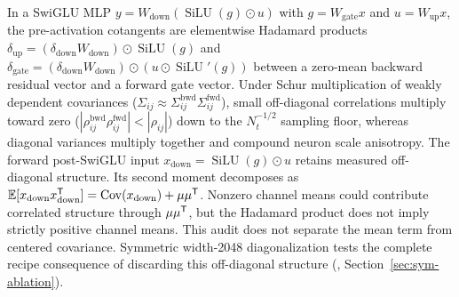 \begin{finding}
In a SwiGLU MLP $y = W_{\text{down}}(\operatorname{SiLU}(g)\odot u)$ with
$g=W_{\text{gate}}x$ and $u=W_{\text{up}}x$, the pre-activation cotangents are
elementwise Hadamard products
$\delta_{\text{up}} = (\delta_{\text{down}}W_{\text{down}})\odot \operatorname{SiLU}(g)$
and $\delta_{\text{gate}} = (\delta_{\text{down}}W_{\text{down}})\odot (u\odot \operatorname{SiLU}'(g))$
between a zero-mean backward residual vector and a forward gate vector. Under
Schur multiplication of weakly dependent covariances
($\Sigma_{ij} \approx \Sigma^{\text{bwd}}_{ij}\Sigma^{\text{fwd}}_{ij}$), small
off-diagonal correlations multiply toward zero ($|\rho_{ij}^{\text{bwd}}\rho_{ij}^{\text{fwd}}| < |\rho_{ij}|$)
down to the $N_t^{-1/2}$ sampling floor, whereas diagonal variances multiply
together and compound neuron scale anisotropy. The forward post-SwiGLU input
$x_{\text{down}} = \operatorname{SiLU}(g)\odot u$ retains measured off-diagonal
structure. Its second moment decomposes as
$\mathbb E[x_{\text{down}}x_{\text{down}}^{{\mathsf T}}]
=\operatorname{Cov}(x_{\text{down}})+\mu\mu^{{\mathsf T}}$.
Nonzero channel means could contribute correlated structure through
$\mu\mu^{{\mathsf T}}$, but the Hadamard product does not imply strictly positive
channel means. This audit does not separate the mean term from centered
covariance. Symmetric width-2048 diagonalization tests the complete recipe
consequence of discarding this off-diagonal structure
(, Section~\ref{sec:sym-ablation}).
\end{finding}

